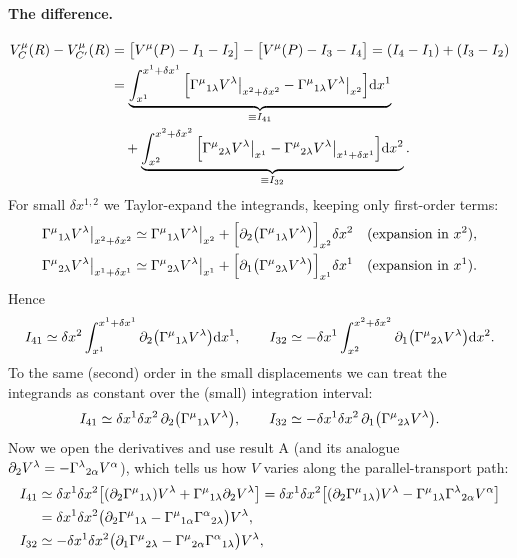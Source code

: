 \paragraph{The difference.}
\begin{align}
  V_C^\mu(R)-V_{C'}^\mu(R)&=\big[V^\mu(P)-I_1-I_2\big]-\big[V^\mu(P)-I_3-I_4\big]=(I_4-I_1)+(I_3-I_2)\nonumber\\
  &=\underbrace{\int_{x^1}^{x^1+\delta x^1}\Big[\Gamma^{\mu}{}_{1\lambda}V^\lambda\big|_{x^2+\delta x^2}-\Gamma^{\mu}{}_{1\lambda}V^\lambda\big|_{x^2}\Big]\mathrm{d} x^1}_{\equiv I_{41}}\nonumber\\
  &\quad+\underbrace{\int_{x^2}^{x^2+\delta x^2}\Big[\Gamma^{\mu}{}_{2\lambda}V^\lambda\big|_{x^1}-\Gamma^{\mu}{}_{2\lambda}V^\lambda\big|_{x^1+\delta x^1}\Big]\mathrm{d} x^2}_{\equiv I_{32}} .
\end{align}
For small $\delta x^{1,2}$ we Taylor-expand the integrands, keeping only first-order terms:
\begin{align*}
  \Gamma^{\mu}{}_{1\lambda}V^\lambda\big|_{x^2+\delta x^2}&\simeq\Gamma^{\mu}{}_{1\lambda}V^\lambda\big|_{x^2}+\Big[\partial_2\big(\Gamma^{\mu}{}_{1\lambda}V^\lambda\big)\Big]_{x^2}\delta x^2 \quad\text{(expansion in $x^2$)},\\
  \Gamma^{\mu}{}_{2\lambda}V^\lambda\big|_{x^1+\delta x^1}&\simeq\Gamma^{\mu}{}_{2\lambda}V^\lambda\big|_{x^1}+\Big[\partial_1\big(\Gamma^{\mu}{}_{2\lambda}V^\lambda\big)\Big]_{x^1}\delta x^1 \quad\text{(expansion in $x^1$)}.
\end{align*}
Hence
\[
  I_{41}\simeq\delta x^2\int_{x^1}^{x^1+\delta x^1}\partial_2\big(\Gamma^{\mu}{}_{1\lambda}V^\lambda\big)\mathrm{d} x^1,\qquad
  I_{32}\simeq-\delta x^1\int_{x^2}^{x^2+\delta x^2}\partial_1\big(\Gamma^{\mu}{}_{2\lambda}V^\lambda\big)\mathrm{d} x^2 .
\]
To the same (second) order in the small displacements we can treat the integrands as constant over the (small) integration interval:
\[
  I_{41}\simeq\delta x^1\delta x^2\,\partial_2\big(\Gamma^{\mu}{}_{1\lambda}V^\lambda\big),\qquad I_{32}\simeq-\delta x^1\delta x^2\,\partial_1\big(\Gamma^{\mu}{}_{2\lambda}V^\lambda\big).
\]
Now we open the derivatives and use result A (and its analogue $\partial_2V^\lambda=-\Gamma^{\lambda}{}_{2\alpha}V^\alpha$), which tells us how $V$ varies along the parallel-transport path:
\begin{align*}
  I_{41}&\simeq\delta x^1\delta x^2\big[(\partial_2\Gamma^{\mu}{}_{1\lambda})V^\lambda+\Gamma^{\mu}{}_{1\lambda}\partial_2V^\lambda\big]
  =\delta x^1\delta x^2\big[(\partial_2\Gamma^{\mu}{}_{1\lambda})V^\lambda-\Gamma^{\mu}{}_{1\lambda}\Gamma^{\lambda}{}_{2\alpha}V^\alpha\big]\\
  &=\delta x^1\delta x^2\big(\partial_2\Gamma^{\mu}{}_{1\lambda}-\Gamma^{\mu}{}_{1\alpha}\Gamma^{\alpha}{}_{2\lambda}\big)V^\lambda,\\
  I_{32}&\simeq-\delta x^1\delta x^2\big(\partial_1\Gamma^{\mu}{}_{2\lambda}-\Gamma^{\mu}{}_{2\alpha}\Gamma^{\alpha}{}_{1\lambda}\big)V^\lambda ,
\end{align*}
